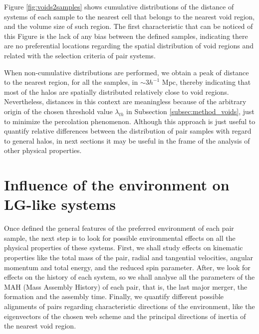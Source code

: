 \documentclass[usenatbib]{latex/mn2e}
\begin{document}
Figure \ref{fig:voids2samples} shows cumulative distributions of the 
distance of systems of each sample to the nearest cell that belongs to the
nearest void region, and the volume size of such region. The first 
characteristic that can be noticed of this Figure is the lack of any bias
between the defined samples, indicating there are no preferential locations
regarding the spatial distribution of void regions and related with the 
selection criteria of pair systems. 



When non-cumulative distributions are performed, we obtain a peak of 
distance to the nearest region, for all the samples, in $\sim 3 h^{-1}$ 
Mpc, thereby indicating that most of the halos are spatially distributed 
relatively close to void regions. Nevertheless, distances in this context 
are meaningless because of the arbitrary origin of the chosen threshold 
value $\lambda_{th}$ in Subsection \ref{subsec:method_voids}, just to 
minimize the percolation phenomenon. Although this approach is just useful 
to quantify relative differences between the distribution of pair samples 
with regard to general halos, in next sections it may be useful in the frame
of the analysis of other physical properties. 



\section{Influence of the environment on LG-like systems}
\label{sec:influence_environment_LG}



Once defined the general features of the preferred environment of each 
pair sample, the next step is to look for possible environmental effects 
on all the physical properties of these systems. First, we shall study 
effects on kinematic properties like the total mass of the pair, radial 
and tangential velocities, angular momentum and total energy, and the 
reduced spin parameter. After, we look for effects on the history of 
each system, so we shall analyse all the parameters of the MAH (Mass 
Assembly History) of each pair, that is, the last major merger, the 
formation and the assembly time. Finally, we quantify different possible 
alignments of pairs regarding characteristic directions of the environment, 
like the eigenvectors of the chosen web scheme and the principal 
directions of inertia of the nearest void region.
\end{document}
